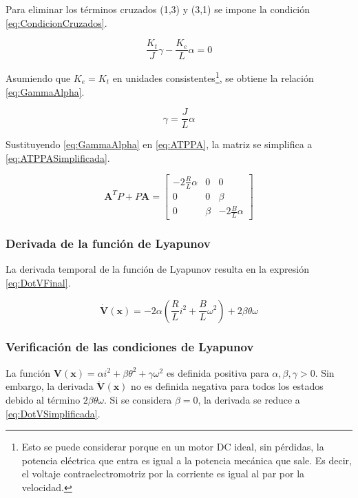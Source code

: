 Para eliminar los términos cruzados (1,3) y (3,1) se impone la condición
\eqref{eq:CondicionCruzados}.

\begin{equation}
    \frac{K_t}{J}\gamma - \frac{K_e}{L}\alpha = 0
    \label{eq:CondicionCruzados}
\end{equation}

Asumiendo que $K_e = K_t$ en unidades consistentes\footnote{Esto se puede considerar
porque en un motor DC ideal, sin pérdidas, la potencia eléctrica que entra es igual
a la potencia mecánica que sale. Es decir, el voltaje contraelectromotriz por la
corriente es igual al par por la velocidad.}, se obtiene la relación
\eqref{eq:GammaAlpha}.

\begin{equation}
    \gamma = \frac{J}{L} \alpha
    \label{eq:GammaAlpha}
\end{equation}

Sustituyendo \eqref{eq:GammaAlpha} en \eqref{eq:ATPPA}, la matriz se simplifica
a \eqref{eq:ATPPASimplificada}.

\begin{equation}
    \mathbf{A}^T P + P \mathbf{A} = 
    \begin{bmatrix} 
        -2\frac{R}{L}\alpha & 0 & 0 \\
        0 & 0 & \beta \\
        0 & \beta & -2\frac{B}{L}\alpha
    \end{bmatrix}
    \label{eq:ATPPASimplificada}
\end{equation}

\subsubsection{Derivada de la función de Lyapunov}

La derivada temporal de la función de Lyapunov resulta en la expresión
\eqref{eq:DotVFinal}.

\begin{equation}
    \mathbf{\dot{V}}(\mathbf{x}) = -2\alpha\left( \frac{R}{L} i^2 + \frac{B}{L} \omega^2 \right) + 2\beta \theta \omega
    \label{eq:DotVFinal}
\end{equation}

\subsubsection{Verificación de las condiciones de Lyapunov}

La función $\mathbf{V}(\mathbf{x}) = \alpha i^2 + \beta \theta^2 + \gamma \omega^2$ es
definida positiva para $\alpha, \beta, \gamma > 0$. Sin embargo, la derivada
$\mathbf{\dot{V}}(\mathbf{x})$ no es definida negativa para todos los estados debido al
término $2\beta \theta \omega$. Si se considera $\beta = 0$, la derivada se
reduce a \eqref{eq:DotVSimplificada}.

